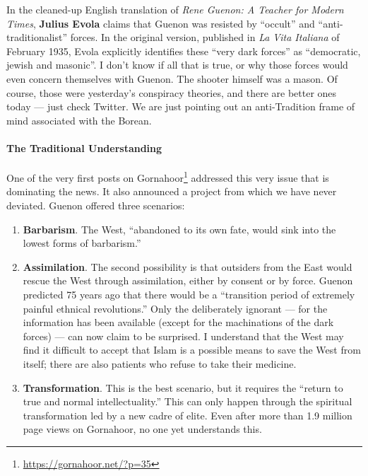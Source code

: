 In the cleaned-up English translation of \textit{Rene Guenon: A Teacher for Modern Times}, \textbf{Julius Evola} claims that Guenon was resisted by ``occult'' and ``anti-traditionalist'' forces. In the original version, published in \textit{La Vita Italiana} of February 1935, Evola explicitly identifies these ``very dark forces'' as ``democratic, jewish and masonic''. I don't know if all that is true, or why those forces would even concern themselves with Guenon. The shooter himself was a mason. Of course, those were yesterday's conspiracy theories, and there are better ones today --- just check Twitter. We are just pointing out an anti-Tradition frame of mind associated with the Borean.

\paragraph{The Traditional Understanding}


One of the very first posts on Gornahoor\footnote{\url{https://gornahoor.net/?p=35}} addressed this very issue that is dominating the news. It also announced a project from which we have never deviated. Guenon offered three scenarios:

\begin{enumerate}


\item \textbf{Barbarism}. The West, ``abandoned to its own fate, would sink into the lowest forms of barbarism.''

\item \textbf{Assimilation}. The second possibility is that outsiders from the East would rescue the West through assimilation, either by consent or by force. Guenon predicted 75 years ago that there would be a ``transition period of extremely painful ethnical revolutions.'' Only the deliberately ignorant --- for the information has been available (except for the machinations of the dark forces) --- can now claim to be surprised. I understand that the West may find it difficult to accept that Islam is a possible means to save the West from itself; there are also patients who refuse to take their medicine.

\item \textbf{Transformation}. This is the best scenario, but it requires the ``return to true and normal intellectuality.'' This can only happen through the spiritual transformation led by a new cadre of elite. Even after more than 1.9 million page views on Gornahoor, no one yet understands this.
\end{enumerate}


